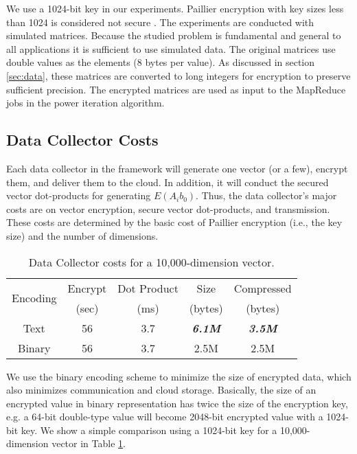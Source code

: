 \documentclass[10pt, conference, compsocconf]{IEEEtran}
\begin{document}
We use a 1024-bit key in our experiments. Paillier encryption with key sizes less than 1024 is considered not secure \cite{lenstra01}. 
The experiments are conducted with simulated matrices. Because the studied problem is fundamental and general to all applications it is sufficient to use simulated data. The original matrices use double values as the elements (8 bytes per value). As discussed in section \ref{sec:data}, these matrices are converted to long integers for encryption to preserve sufficient precision. The encrypted matrices are used as input to the MapReduce jobs in the power iteration algorithm. 

\subsection{Data Collector Costs}
Each data collector in the framework will generate one vector (or a few), encrypt them, and deliver them to the cloud. In addition, it will conduct the secured vector dot-products for generating $E(A_ib_0)$. Thus, the data collector's major costs are on vector encryption, secure vector dot-products, and transmission. These costs are determined by the basic cost of Paillier encryption (i.e., the key size) and the number of dimensions.

\begin{table}[tbh]
\centering
\scriptsize
\begin{tabular}{|c|c|c|c|c|}
\hline
\multirow{2}{*}{Encoding} & Encrypt & Dot Product & Size & Compressed \\
& (sec) & (ms) & (bytes) & (bytes) \\
\hline
Text& 56 & 3.7 & \textbf{\emph{6.1M}} & \textbf{\emph{3.5M}} \\
Binary& 56 & 3.7 & 2.5M & 2.5M\\
\hline
\end{tabular}
\caption{Data Collector costs for a 10,000-dimension vector.} \label{tab:collector-costs}
\vspace{-0.5cm}
\normalsize
\end{table}
 
We use the binary encoding scheme to minimize the size of encrypted data, which also minimizes communication and cloud storage. Basically, the size of an encrypted value in binary representation has twice the size of the encryption key, e.g. a 64-bit double-type value will become 2048-bit encrypted value with a 1024-bit key. We show a simple comparison using a 1024-bit key for a 10,000-dimension vector in Table \ref{tab:collector-costs}. 
\end{document}
